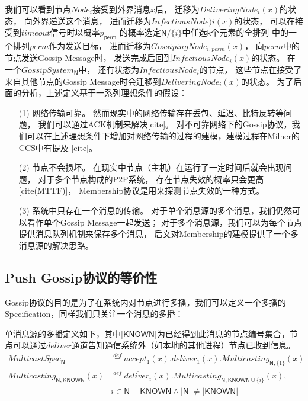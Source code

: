 我们可以看到节点$Node_i$接受到外界消息$x$后，
迁移为$DeliveringNode_i(x)$的状态，
向外界递送这个消息，
进而迁移为$InfectiousNode)i(x)$的状态，
可以在接受到$timeout$信号时以概率$p_{\mathsf{perm}}$
的概率选定$\mathsf{N}/\{i\}$中任选$\mathsf{k}$个元素的全排列
中的一个排列$perm$作为发送目标，
进而迁移为$GossipingNode_{i,perm}(x)$，
向$perm$中的节点发送Gossip Message时，
发送完成后回到$InfectiousNode_i(x)$的状态。
在一个$GossipSystem_{\mathsf{N}}$中，
还有状态为$InfectiousNode_i$的节点，
这些节点在接受了来自其他节点的Gossip Message时会迁移到$DeliveringNode_i(x)$的状态。
为了后面的分析，上述定义基于一系列理想条件的假设：
\begin{itemize}
   \item [(1)] {网络传输可靠。
   然而现实中的网络传输存在丢包、延迟、比特反转等问题，
   我们可以通过ACK机制来解决[cite]。
   对不可靠网络下的Gossip协议，我们可以在上述理想条件下增加对网络传输的过程的建模，建模过程在Milner的CCS中有提及
   [cite]。
   }
   \item [(2)] {节点不会损坏。
   在现实中节点（主机）在运行了一定时间后就会出现问题，
   对于多个节点构成的P2P系统，
   存在节点失效的概率只会更高[cite(MTTF)]，
   Membership协议是用来探测节点失效的一种方式。
   }
   \item [(3)] {
      系统中只存在一个消息的传输。
      对于单个消息源的多个消息，我们仍然可以看作单个Gossip Message一起发送；
      对于多个消息源，我们可以为每个节点提供消息队列机制来保存多个消息，
      后文对Membership的建模提供了一个多消息源的解决思路。
      }
\end{itemize}

\subsection{Push Gossip协议的等价性}

Gossip协议的目的是为了在系统内对节点进行多播，我们可以定义一个多播的Specification，同样我们只关注一个消息的多播：
\begin{definition} 单消息源的多播定义如下，其中$|\mathsf{KNOWN}|$为已经得到此消息的节点编号集合，节点可以通过$deliver$通道告知通信系统外（如本地的其他进程）节点已收到信息。
\begin{align*} 
    MulticastSpec_\mathsf{N}&\stackrel{def}{=}accept_1(x).\overline{deliver_1}(x).Multicasting_{\mathsf{N},\{1\}}(x)\\
    Multicasting_{\mathsf{N},\mathsf{KNOWN}}(x)&\stackrel{def}{=}\overline{deliver_i}(x).Multicasting_{\mathsf{N},\mathsf{KNOWN}\cup\{i\}}(x), \\
    &i\in \mathsf{N}-\mathsf{KNOWN} \wedge |\mathsf{N}|\neq |\mathsf{KNOWN}|
 \end{align*}
\end{definition} 

